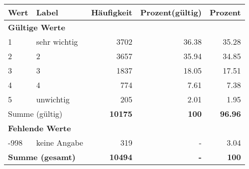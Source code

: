      \begin{longtable}{lXrrr}
     \toprule
     \textbf{Wert} & \textbf{Label} & \textbf{Häufigkeit} & \textbf{Prozent(gültig)} & \textbf{Prozent} \\
     \endhead
     \midrule
     \multicolumn{5}{l}{\textbf{Gültige Werte}}\\

     1 &
     \multicolumn{1}{X}{ sehr wichtig   } &


       \num{3702} &
       \num[round-mode=places,round-precision=2]{36,38} &
         \num[round-mode=places,round-precision=2]{35,28} \\

     2 &
     \multicolumn{1}{X}{ 2   } &


       \num{3657} &
       \num[round-mode=places,round-precision=2]{35,94} &
         \num[round-mode=places,round-precision=2]{34,85} \\

     3 &
     \multicolumn{1}{X}{ 3   } &


       \num{1837} &
       \num[round-mode=places,round-precision=2]{18,05} &
         \num[round-mode=places,round-precision=2]{17,51} \\

     4 &
     \multicolumn{1}{X}{ 4   } &


       \num{774} &
       \num[round-mode=places,round-precision=2]{7,61} &
         \num[round-mode=places,round-precision=2]{7,38} \\

     5 &
     \multicolumn{1}{X}{ unwichtig   } &


       \num{205} &
       \num[round-mode=places,round-precision=2]{2,01} &
         \num[round-mode=places,round-precision=2]{1,95} \\
     \midrule
     \multicolumn{2}{l}{Summe (gültig)} &
       \textbf{\num{10175}} &
     \textbf{100} &
       \textbf{\num[round-mode=places,round-precision=2]{96,96}} \\
     \multicolumn{5}{l}{\textbf{Fehlende Werte}}\\
       -998 &
       keine Angabe &
         \num{319} &
        - &
         \num[round-mode=places,round-precision=2]{3,04} \\
     \midrule
     \multicolumn{2}{l}{\textbf{Summe (gesamt)}} &
          \textbf{\num{10494}} &
        \textbf{-} &
        \textbf{100} \\
     \bottomrule
     \end{longtable}
     

